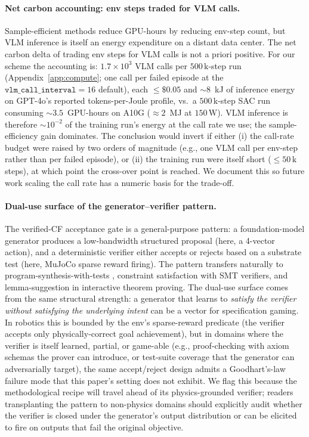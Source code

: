 \paragraph{Net carbon accounting: env steps traded for VLM calls.}
Sample-efficient methods reduce GPU-hours by reducing env-step count,
but VLM inference is itself an energy expenditure on a distant data
center. The net carbon delta of trading env steps for VLM calls is
not a priori positive. For our scheme the accounting is:
$1.7\!\times\!10^3$ VLM calls per $500\,\mathrm{k}$-step run
(Appendix~\ref{app:compute}; one call per failed episode at the
$\texttt{vlm\_call\_interval}\!=\!16$ default), each
$\le\!\$0.05$ and $\sim\!8$~kJ of inference energy on
GPT-4o's reported tokens-per-Joule profile, vs.\ a $500\,\mathrm{k}$-step
SAC run consuming $\sim\!3.5$~GPU-hours on A10G ($\approx\!2$~MJ at
$150\,\mathrm{W}$). VLM inference is therefore $\sim\!10^{-2}$ of the
training run's energy at the call rate we use; the sample-efficiency
gain dominates. The conclusion would invert if either (i) the
call-rate budget were raised by two orders of magnitude (e.g., one
VLM call per env-step rather than per failed episode), or (ii) the
training run were itself short ($\le\!50\,\mathrm{k}$ steps), at which
point the cross-over point is reached. We document this so future
work scaling the call rate has a numeric basis for the trade-off.

\paragraph{Dual-use surface of the generator--verifier pattern.}
The verified-CF acceptance gate is a general-purpose pattern: a
foundation-model generator produces a low-bandwidth structured
proposal (here, a 4-vector action), and a deterministic verifier
either accepts or rejects based on a substrate test (here, MuJoCo
sparse reward firing). The pattern transfers naturally to
program-synthesis-with-tests \citep{zha2025tango}, constraint
satisfaction with SMT verifiers, and lemma-suggestion in interactive
theorem proving. The dual-use surface comes from the same structural
strength: a generator that learns to \emph{satisfy the verifier
without satisfying the underlying intent} can be a vector for
specification gaming. In robotics this is bounded by the env's
sparse-reward predicate (the verifier accepts only physically-correct
goal achievement), but in domains where the verifier is itself
learned, partial, or game-able (e.g., proof-checking with axiom
schemas the prover can introduce, or test-suite coverage that the
generator can adversarially target), the same accept/reject design
admits a Goodhart's-law failure mode that this paper's setting does
not exhibit. We flag this because the methodological recipe will
travel ahead of its physics-grounded verifier; readers transplanting
the pattern to non-physics domains should explicitly audit whether
the verifier is closed under the generator's output distribution or
can be elicited to fire on outputs that fail the original objective.

